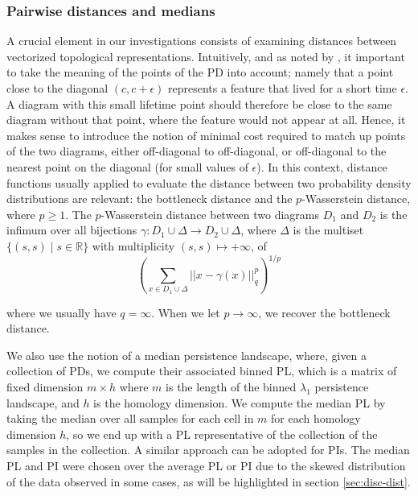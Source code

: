 \documentclass{article}
\begin{document}
\subsubsection{Pairwise distances and medians}\label{sec:pairwise_distance_definitions}

A crucial element in our investigations consists of examining distances between vectorized
topological representations. Intuitively, and as noted by
\citep{berwald2018computing}, it important to take the meaning of the points of the PD into account;
namely that a point close to the diagonal $(c,c+\epsilon)$ represents a feature that lived for a
short time $\epsilon$. A diagram with this small lifetime point should therefore be close to the
same diagram without that point, where the feature would not appear at all. Hence, it makes sense to
introduce the notion of minimal cost required to match up points of the two diagrams, either
off-diagonal to off-diagonal, or off-diagonal to the nearest point on the diagonal (for small values
of $\epsilon$). In this context, distance functions usually applied to evaluate the distance between
two probability density distributions are relevant: the bottleneck distance and the $p$-Wasserstein
distance, where $p\geq 1$. The $p$-Wasserstein distance between two diagrams $D_1$ and $D_2$ is the
infimum over all bijections $\gamma: D_1 \cup \Delta \to D_2 \cup \Delta$, where $\Delta$ is the
multiset $\lbrace (s, s) \mid s \in \mathbb{R} \rbrace$ with multiplicity $(s,s) \mapsto +\infty$,
of
\begin{equation}
  \label{eq:wasserstein_distance}
  \left(\sum_{x \in D_1 \cup \Delta} ||x - \gamma(x)||_q^p \right)^{1/p}
\end{equation}

where we usually have $q=\infty$. When we let $p\to\infty$, we recover the bottleneck distance.

We also use the notion of a median persistence landscape, where, given a collection of PDs, we
compute their associated binned PL, which is a matrix of fixed dimension $m\times h$ where $m$ is the
length of the binned $\lambda_1$ persistence landscape, and $h$ is the homology dimension. We compute the median PL by taking the
median over all samples for each cell in $m$ for each homology dimension $h$, so we end up with a PL
representative of the collection of the samples in the collection. A similar approach can be adopted
for PIs. The median PL and PI were chosen over the average PL or PI due to the skewed distribution of
the data observed in some cases, as will be highlighted in section \ref{sec:disc-dist}.
\end{document}
